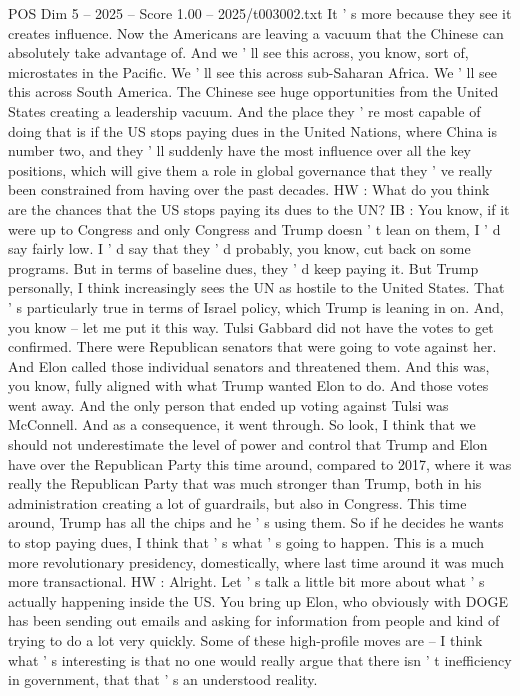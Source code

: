 \begin{textsample}{POS Dim 5 – 2025 – Score 1.00 – 2025/t003002.txt}
It ' s more because they see it creates influence.
Now the Americans are leaving a vacuum that the Chinese can absolutely take advantage of.
And we ' ll see this across, you know, sort of, microstates in the Pacific.
We ' ll see this across sub-Saharan Africa.
We ' ll see this across South America.
The Chinese see huge opportunities from the United States creating a leadership vacuum.
And the place they ' re most capable of doing that is if the US stops paying dues in the United Nations, where China is number two, and they ' ll suddenly have the most influence over all the key positions, which will give them a role in global governance that they ' ve really been constrained from having over the past decades.
HW : What do you think are the chances that the US stops paying its dues to the UN?
IB : You know, if it were up to Congress and only Congress and Trump doesn ' t lean on them, I ' d say fairly low.
I ' d say that they ' d probably, you know, cut back on some programs.
But in terms of baseline dues, they ' d keep paying it.
But Trump personally, I think increasingly sees the UN as hostile to the United States.
That ' s particularly true in terms of Israel policy, which Trump is leaning in on.
And, you know -- let me put it this way.
Tulsi Gabbard did not have the votes to get confirmed.
There were Republican senators that were going to vote against her.
And Elon called those individual senators and threatened them.
And this was, you know, fully aligned with what Trump wanted Elon to do.
And those votes went away.
And the only person that ended up voting against Tulsi was McConnell.
And as a consequence, it went through.
So look, I think that we should not underestimate the level of power and control that Trump and Elon have over the Republican Party this time around, compared to 2017, where it was really the Republican Party that was much stronger than Trump, both in his administration creating a lot of guardrails, but also in Congress.
This time around, Trump has all the chips and he ' s using them.
So if he decides he wants to stop paying dues, I think that ' s what ' s going to happen.
This is a much more revolutionary presidency, domestically, where last time around it was much more transactional.
HW : Alright.
Let ' s talk a little bit more about what ' s actually happening inside the US.
You bring up Elon, who obviously with DOGE has been sending out emails and asking for information from people and kind of trying to do a lot very quickly.
Some of these high-profile moves are -- I think what ' s interesting is that no one would really argue that there isn ' t inefficiency in government, that that ' s an understood reality.

\end{textsample}
